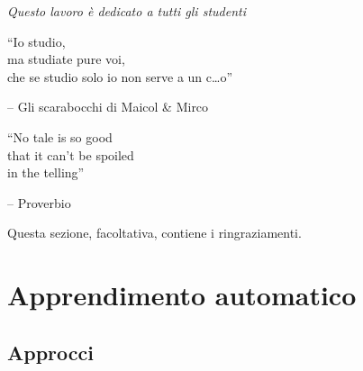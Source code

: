 \documentclass[12pt,italian]{report}
\begin{document}
\frontespizio
\beforepreface

% 
%

{\raggedleft \large \sl Questo lavoro \`{e} dedicato a tutti gli studenti\\
	
	\vspace{2cm}
	
	``Io studio,\\ma studiate pure voi,\\che se studio solo io non serve a un c\dots o''
	
	\bigskip
	
	\--- Gli scarabocchi di Maicol \& Mirco\\
  
	\vspace{2cm}
	
	``No tale is so good \\ that it can't be spoiled \\ in the telling''
	
	\bigskip
	
	\--- Proverbio\\}
         
% 
%


%
%

Questa sezione, facoltativa, contiene i ringraziamenti.

%
%

\afterpreface

% 
% 

\chapter{Apprendimento automatico}
\label{cap:apprendimento_automatico}

\section{Approcci}
\label{sec:approcci}
\end{document}
